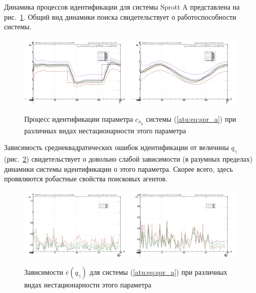 \documentclass[a4paper,12pt]{article}
\begin{document}
Динамика процессов идентификации для системы Sprott A представлена на рис.~\ref{atu:f:spr_a_id}.
Общий вид динамики поиска свидетельствует о работоспособности системы.

\begin{figure}[htb!]
\centerline{
  \includegraphics[width=0.49\textwidth]{p/cha/spr_a/sprott_a_m5p-pl_n_sign.png}
  \includegraphics[width=0.49\textwidth]{p/cha/spr_a/sprott_a_m5p-pl_n_sin.png}
}
\caption{Процесс идентификации параметра $c_{x_y} $ системы (\ref{atu:eq:spr_a})
  при различных видах нестационарности этого параметра
}
\label{atu:f:spr_a_id}
\end{figure}

Зависимость среднеквадратических ошибок идентификации от величины $q_\gamma$ (рис.~\ref{atu:f:spr_a_e_qgamma})
свидетельствует о довольно слабой зависимости (в разумных пределах)
динамики системы идентификации о  этого параметра. Скорее всего,
здесь проявляются робастные свойства поисковых агентов.

\begin{figure}[htb!]
\centerline{
  \includegraphics[width=0.49\textwidth]{p/cha/spr_a/sprott_a_m5p-p_qg_e_sign.png}
  \includegraphics[width=0.49\textwidth]{p/cha/spr_a/sprott_a_m5p-p_qg_e_sin.png}
}
  \caption{Зависимости  $\bar{e}(q_\gamma)$ для системы (\ref{atu:eq:spr_a})
  при различных видах нестационарности этого параметра
}
\label{atu:f:spr_a_e_qgamma}
\end{figure}
\end{document}
